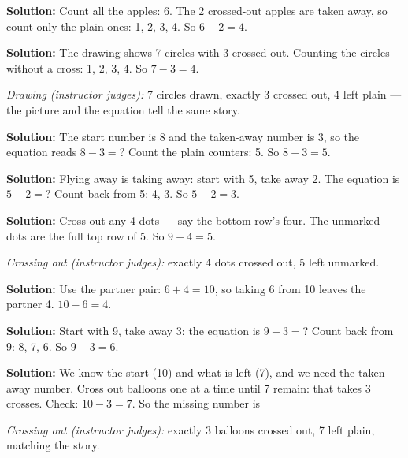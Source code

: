 \documentclass[12pt]{article}
\begin{document}




\textbf{Solution:} Count all the apples: 6. The 2 crossed-out apples are
taken away, so count only the plain ones: 1, 2, 3, 4. So $6-2=4$. 


\textbf{Solution:} The drawing shows 7 circles with 3 crossed out. Counting
the circles without a cross: 1, 2, 3, 4. So $7-3=4$. 

\emph{Drawing (instructor judges):} 7 circles drawn, exactly 3 crossed out,
4 left plain --- the picture and the equation tell the same story.


\textbf{Solution:} The start number is 8 and the taken-away number is 3, so
the equation reads $8 - 3 = {}$? Count the plain counters: 5. So $8-3=5$.


\textbf{Solution:} Flying away is taking away: start with 5, take away 2.
The equation is $5 - 2 = {}$? Count back from 5: 4, 3. So $5-2=3$. 


\textbf{Solution:} Cross out any 4 dots --- say the bottom row's four. The
unmarked dots are the full top row of 5. So $9-4=5$. 

\emph{Crossing out (instructor judges):} exactly 4 dots crossed out,
5 left unmarked.


\textbf{Solution:} Use the partner pair: $6+4=10$, so taking 6 from 10
leaves the partner 4. $10-6=4$. 


\textbf{Solution:} Start with 9, take away 3: the equation is
$9 - 3 = {}$? Count back from 9: 8, 7, 6. So $9-3=6$. 


\textbf{Solution:} We know the start (10) and what is left (7), and we need
the taken-away number. Cross out balloons one at a time until 7 remain:
that takes 3 crosses. Check: $10-3=7$. So the missing number is 

\emph{Crossing out (instructor judges):} exactly 3 balloons crossed out,
7 left plain, matching the story.
\end{document}
